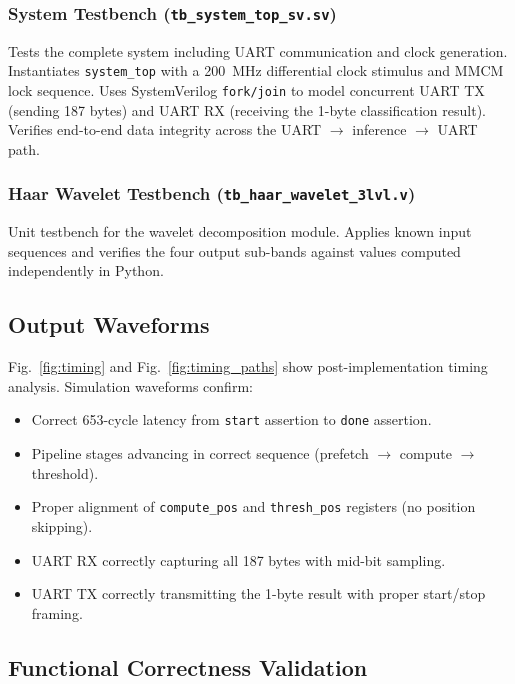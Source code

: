 \documentclass[conference]{IEEEtran}
\begin{document}
\subsubsection{System Testbench (\texttt{tb\_system\_top\_sv.sv})}
Tests the complete system including UART communication and clock generation. Instantiates \texttt{system\_top} with a 200~MHz differential clock stimulus and MMCM lock sequence. Uses SystemVerilog \texttt{fork/join} to model concurrent UART TX (sending 187 bytes) and UART RX (receiving the 1-byte classification result). Verifies end-to-end data integrity across the UART $\rightarrow$ inference $\rightarrow$ UART path.

\subsubsection{Haar Wavelet Testbench (\texttt{tb\_haar\_wavelet\_3lvl.v})}
Unit testbench for the wavelet decomposition module. Applies known input sequences and verifies the four output sub-bands against values computed independently in Python.

\subsection{Output Waveforms}

Fig.~\ref{fig:timing} and Fig.~\ref{fig:timing_paths} show post-implementation timing analysis. Simulation waveforms confirm:
\begin{itemize}
    \item Correct 653-cycle latency from \texttt{start} assertion to \texttt{done} assertion.
    \item Pipeline stages advancing in correct sequence (prefetch $\rightarrow$ compute $\rightarrow$ threshold).
    \item Proper alignment of \texttt{compute\_pos} and \texttt{thresh\_pos} registers (no position skipping).
    \item UART RX correctly capturing all 187 bytes with mid-bit sampling.
    \item UART TX correctly transmitting the 1-byte result with proper start/stop framing.
\end{itemize}

\subsection{Functional Correctness Validation}
\end{document}

